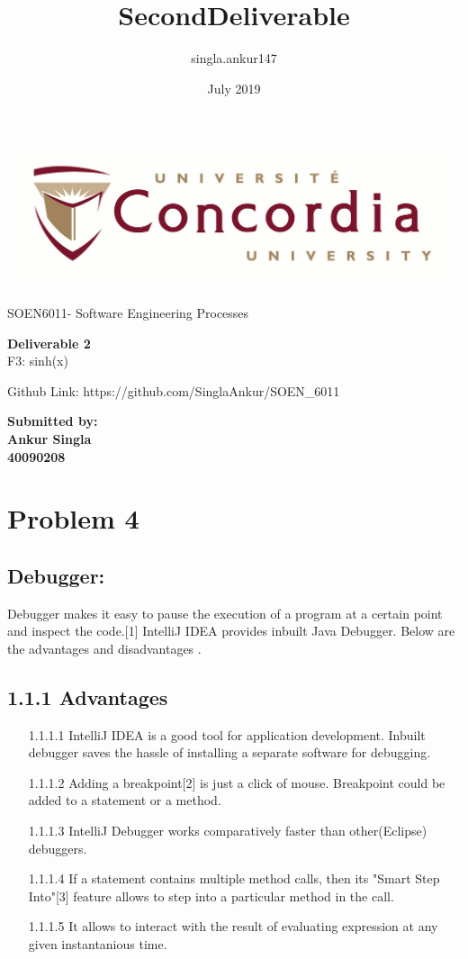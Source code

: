 \documentclass[10pt]{article}
\title{SecondDeliverable}
\author{singla.ankur147 }
\date{July 2019}
\begin{document}
\includegraphics[scale=0.2]{concordia}

\Large SOEN6011- Software Engineering Processes\\
\begin{center}
\textbf{Deliverable 2}\\
F3: sinh(x)
\end{center}

Github Link: https://github.com/SinglaAnkur/SOEN\_6011
\vspace{90mm}\\
\begin{large}
\textbf{Submitted by:}\\
\textbf{Ankur Singla}\\
\textbf{40090208}\\
\end{large}
\newpage
\tableofcontents
\newpage
\section{Problem 4}
\subsection{Debugger:}
Debugger makes it easy to pause the execution of a program at a certain point and inspect the code.[1] IntelliJ IDEA provides inbuilt Java Debugger. Below are the advantages and disadvantages .\\
\subsection*{\large 1.1.1 Advantages}
\begin{description}
\begin{itemize}
\item [1.1.1.1] IntelliJ IDEA is a good tool for application development. Inbuilt debugger saves the hassle of installing a separate software for debugging.
\item [1.1.1.2]Adding a breakpoint[2] is just a click of mouse. Breakpoint could be added to a statement or a method.
\item [1.1.1.3]IntelliJ Debugger works comparatively faster than other(Eclipse) debuggers.
\item [1.1.1.4]If a statement contains multiple method calls, then its "Smart Step Into"[3] feature allows to step into a particular method in the call.
\item [1.1.1.5]It allows to interact with the result of evaluating expression at any given instantanious time.
\end{itemize}
\end{description}
\end{document}
